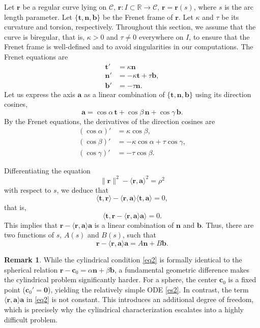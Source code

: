 \documentclass[a4paper,12pt]{amsart}
\theoremstyle{plain}
\theoremstyle{definition}
\newtheorem{remark}[theorem]{Remark}
\newcommand{\bfr}{\mathbf{r}}
\newcommand{\bfa}{\mathbf{a}}
\newcommand{\bft}{\mathbf{t}}
\newcommand{\bfn}{\mathbf{n}}
\newcommand{\bfb}{\mathbf{b}}
\def\cy{\mathcal C}
\def\r{\mathbb R}
\begin{document}
 Let $\bfr$ be a regular curve lying on  $\cy$, $\bfr\colon I\subset\r\to\cy$, $\bfr=\bfr(s)$, where $s$ is the arc length parameter. 
Let $\{\bft,\bfn,\bfb\}$ be the Frenet frame of $\bfr$. Let $\kappa$ and $\tau$ be its curvature and torsion, respectively. Throughout this section, we assume that the curve 
is biregular, that is, $\kappa > 0$ and $\tau \neq 0$ everywhere on $I$, to 
ensure that the Frenet frame is well-defined and to avoid singularities 
in our computations.  The Frenet equations are 
\begin{equation*}
    \begin{split}
        \bft'&=\kappa\bfn\\
        \bfn'&=-\kappa\bft+\tau \bfb,\\
        \bfb'&=-\tau\bfn.
    \end{split}
\end{equation*}
Let us express the axis $\bfa$ as a linear combination of $\{\bft,\bfn,\bfb\}$ using its direction cosines, 
\begin{equation}\label{eqa}
    \bfa = \cos\alpha\,\bft + \cos\beta\,\bfn + \cos\gamma\,\bfb.
\end{equation}
By the Frenet equations, the derivatives of the direction cosines are
 \begin{equation}\label{ss}
 \begin{split}
     (\cos\alpha)'&=\kappa\cos\beta,\\
    ( \cos\beta)'&=-\kappa\cos\alpha+\tau\cos\gamma,\\
     (\cos\gamma)'&=-\tau\cos\beta.
 \end{split}
 \end{equation}
 
 
Differentiating  the equation 
\begin{equation}\label{eq0}
\|\bfr\|^2-\langle\bfr,\bfa\rangle^2 = \rho^2
\end{equation}
with respect to $s$, we  deduce that
\begin{equation}\label{eq1}
    \langle\bft,\bfr\rangle-\langle\bfr,\bfa\rangle\langle\bft,\bfa\rangle = 0, 
\end{equation}
that is,
$$\langle \bft,\bfr-\langle\bfr,\bfa\rangle\bfa\rangle=0.$$
This implies that $\bfr-\langle\bfr,\bfa\rangle\bfa$ is a linear combination of $\bfn$ and $\bfb$. Thus, there are two functions of $s$, $A(s)$ and $B(s)$, such that 
\begin{equation}\label{eq2}
\bfr-\langle\bfr,\bfa\rangle\bfa=A\bfn+B\bfb.
\end{equation}
\begin{remark}
While the cylindrical condition \eqref{eq2} is formally identical to the   spherical relation $\mathbf{r}-\mathbf{c}_0 = \alpha \mathbf{n} + \beta \mathbf{b}$, a fundamental geometric difference makes the cylindrical problem significantly harder. For a sphere, the center $\mathbf{c}_0$ is a fixed point ($\mathbf{c}_0' = \mathbf{0}$), yielding the relatively simple ODE \eqref{es2}.   In contrast, the term  $\langle\bfr,\bfa\rangle\bfa$ in \eqref{eq2} is not constant.  This introduces an additional degree of freedom, which is precisely why the cylindrical characterization escalates into a   highly  difficult problem. 
\end{remark}
\end{document}
